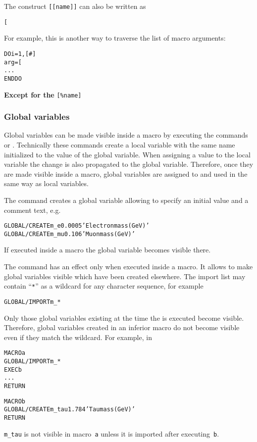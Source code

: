The construct \texttt{[[name]]} can also be written as 
\begin{alltt}
[%name]
\end{alltt}
\MacVar[indirection]{}
For example, this is another way to traverse the list of macro arguments:
\begin{alltt}
DO i=1,[#]
  arg = [%i]
  ...
ENDDO
\end{alltt}

\textbf{Except for the} \texttt{[\%name]} 

\subsubsection{Global variables}

Global variables can be made visible inside a macro by executing the
commands  or .
Technically these commands create a local variable with the same name
initialized to the value of the global variable.
When assigning a value to the local variable the change is also
propagated to the global variable.
Therefore, once they are made visible inside a macro, global variables
are assigned to and used in the same way as local variables. 

The  command creates a global variable allowing to
specify an initial value and a comment text, e.g.\
\begin{alltt}
GLOBAL/CREATE m_e  0.0005 'Electron mass (GeV)'
GLOBAL/CREATE m_mu 0.106  'Muon mass (GeV)'
\end{alltt}
If executed inside a macro the global variable becomes visible there.

The  command has an effect only when executed
inside a macro.
It allows to make global variables visible which have been created
elsewhere.
The import list may contain ``\texttt{*}'' as a wildcard for any
character sequence, for example
\begin{alltt}
GLOBAL/IMPORT m_*
\end{alltt}
Only those global variables existing at the time the
 is executed become visible.
Therefore, global variables created in an inferior macro do not become visible
even if they match the wildcard.
For example, in
\begin{alltt}
MACRO a
GLOBAL/IMPORT m_*
EXEC b
...
RETURN

MACRO b
GLOBAL/CREATE m_tau 1.784 'Tau mass (GeV)'
RETURN
\end{alltt}
\texttt{m\_tau} is not visible in macro~\texttt{a} unless it is imported
after executing~\texttt{b}. 

